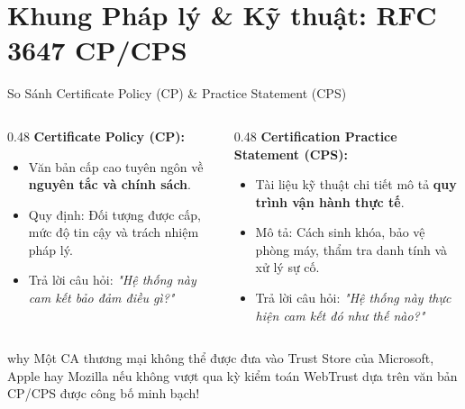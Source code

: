 \section{Khung Pháp lý \& Kỹ thuật: RFC 3647 CP/CPS}

\begin{frame}{So Sánh Certificate Policy (CP) \& Practice Statement (CPS)}
  \begin{columns}[T]
    \begin{column}{0.48\textwidth}
      \textbf{Certificate Policy (CP):}
      \begin{itemize}\small
        \item Văn bản cấp cao tuyên ngôn về \textbf{nguyên tắc và chính sách}.
        \item Quy định: Đối tượng được cấp, mức độ tin cậy và trách nhiệm pháp lý.
        \item Trả lời câu hỏi: \emph{"Hệ thống này cam kết bảo đảm điều gì?"}
      \end{itemize}
    \end{column}
    \begin{column}{0.48\textwidth}
      \textbf{Certification Practice Statement (CPS):}
      \begin{itemize}\small
        \item Tài liệu kỹ thuật chi tiết mô tả \textbf{quy trình vận hành thực tế}.
        \item Mô tả: Cách sinh khóa, bảo vệ phòng máy, thẩm tra danh tính và xử lý sự cố.
        \item Trả lời câu hỏi: \emph{"Hệ thống này thực hiện cam kết đó như thế nào?"}
      \end{itemize}
    \end{column}
  \end{columns}

  \begin{beyond}{why}
    Một CA thương mại không thể được đưa vào Trust Store của Microsoft, Apple hay Mozilla nếu không vượt qua kỳ kiểm toán WebTrust dựa trên văn bản CP/CPS được công bố minh bạch!
  \end{beyond}
\end{frame}

